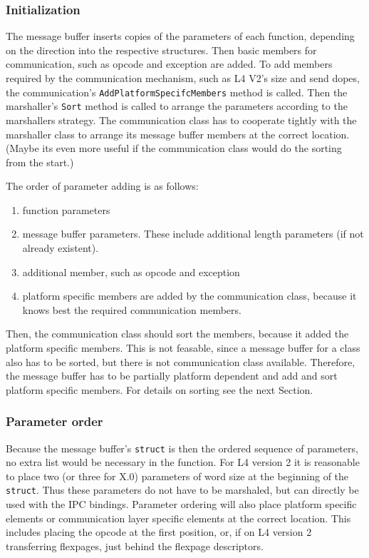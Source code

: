 \subsubsection{Initialization}

The message buffer inserts copies of the parameters of each function,
depending on the direction into the respective structures.  Then basic members
for communication, such as opcode and exception are added.  To add members
required by the communication mechanism, such as L4 V2's size and send dopes,
the communication's \texttt{AddPlatformSpecifcMembers} method is called.  Then
the marshaller's \texttt{Sort} method is called to arrange the parameters
according to the marshallers strategy.  The communication class has to
cooperate tightly with the marshaller class to arrange its message buffer
members at the correct location.  (Maybe its even more useful if the
communication class would do the sorting from the start.)

The order of parameter adding is as follows:

\begin{enumerate}
\item function parameters

\item message buffer parameters.  These include additional length parameters
      (if not already existent).

\item additional member, such as opcode and exception

\item platform specific members are added by the communication class, because
      it knows best the required communication members.
\end{enumerate}

Then, the communication class should sort the members, because it added the
platform specific members.  This is not feasable, since a message buffer for a
class also has to be sorted, but there is not communication class available.
Therefore, the message buffer has to be partially platform dependent and add
and sort platform specific members.  For details on sorting see the next
Section.

\subsubsection{Parameter order}

Because the message buffer's \verb|struct| is then the ordered sequence of
parameters, no extra list would be necessary in the function.  For L4 version
2 it is reasonable to place  two (or three for X.0) parameters of word size at
the beginning of the \verb|struct|.  Thus these parameters do not have to be
marshaled, but can directly be used with the IPC  bindings.  Parameter
ordering will also place platform specific elements or communication layer
specific elements at the correct location.  This includes placing the opcode
at the first position, or, if on L4 version 2 transferring flexpages, just
behind the flexpage descriptors.

